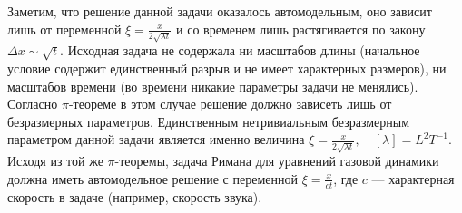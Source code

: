 \documentclass[12pt]{article}
\begin{document}
Заметим, что решение данной задачи оказалось автомодельным, оно зависит лишь от переменной $\xi = \frac{x}{2\sqrt{\lambda t}}$ и со временем лишь растягивается по закону $\Delta x \sim \sqrt{t}$. Исходная задача не содержала ни масштабов длины (начальное условие содержит единственный разрыв и не имеет характерных размеров), ни масштабов времени (во времени никакие параметры задачи не менялись). Согласно $\pi$-теореме в этом случае решение должно зависеть лишь от безразмерных параметров. Единственным нетривиальным безразмерным параметром данной задачи является именно величина $\xi = \frac{x}{2\sqrt{\lambda t}}, \quad [\lambda] = L^2T^{-1}$.
Исходя из той же $\pi$-теоремы, задача Римана для уравнений газовой динамики должна иметь автомодельное решение с переменной $\xi = \frac{x}{ct}$, где $c$ --- характерная скорость в задаче (например, скорость звука).
\end{document}
